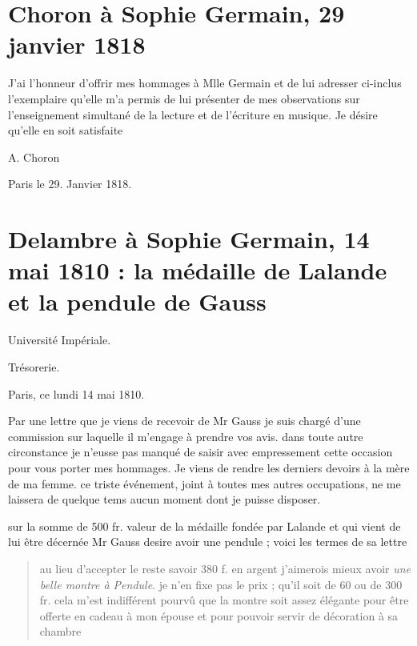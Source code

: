\documentclass[11pt,a4paper]{article}
\begin{document}
\section{Choron à Sophie Germain, 29 janvier 1818}

J'ai l'honneur d'offrir mes hommages à Mlle Germain et de lui adresser
ci-inclus l'exemplaire qu'elle m'a permis de lui présenter de mes
observations sur l'enseignement simultané de la lecture et de l'écriture en
musique. Je désire qu'elle en soit satisfaite

A. Choron

Paris le 29. Janvier 1818.


\section{Delambre à Sophie Germain, 14 mai 1810 : la médaille de Lalande et la pendule de Gauss}

Université Impériale.

Trésorerie.


Paris, ce lundi 14 mai 1810.

Par une lettre que je viens de recevoir de Mr Gauss je suis chargé d'une
commission sur laquelle il m'engage à prendre vos avis. dans toute autre
circonstance je n'eusse pas manqué de saisir avec empressement cette occasion
pour vous porter mes hommages. Je viens de rendre les derniers devoirs à la
mère de ma femme. ce triste événement, joint à toutes mes autres occupations,
ne me laissera de quelque tems aucun moment dont je puisse disposer.

sur la somme de 500 fr. valeur de la médaille fondée par Lalande et qui vient
de lui être décernée Mr Gauss desire avoir une pendule ; voici les termes de
sa lettre

\begin{quote}
au lieu d'accepter le reste savoir 380 f. en argent j'aimerois mieux avoir
\emph{une belle montre à Pendule}. je n'en fixe pas le prix ; qu'il soit de
60 ou de 300 fr. cela m'est indifférent pourvû que la montre soit assez
élégante pour être offerte en cadeau à mon épouse et pour pouvoir servir de
décoration à sa chambre
\end{quote}
\end{document}
